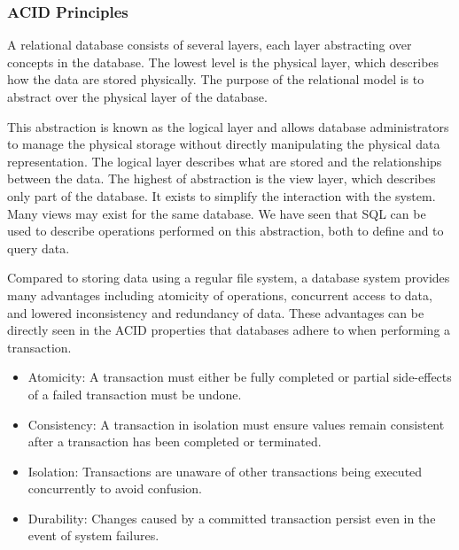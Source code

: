 \subsubsection*{ACID Principles}\label{sec:ACID}

A relational database consists of several layers, each layer abstracting over concepts in the database.
The lowest level is the physical layer, which describes how the data are stored physically.
The purpose of the relational model is to abstract over the physical layer of the database.

This abstraction is known as the logical layer and allows database administrators to manage the physical storage without directly manipulating the physical data representation.
The logical layer describes what are stored and the relationships between the data.
The highest of abstraction is the view layer, which describes only part of the database.
It exists to simplify the interaction with the system. Many views may exist for the same database.
\cite{DBSBook}
We have seen that SQL can be used to describe operations performed on this abstraction, both to define and to query data.

Compared to storing data using a regular file system, a database system provides many advantages including atomicity of operations, concurrent access to data, and lowered inconsistency and redundancy of data\cite{DBSBook}.
These advantages can be directly seen in the ACID properties that databases adhere to when performing a transaction\cite{DBSBook}.
\begin{itemize} \label{ACID}
    \item Atomicity: A transaction must either be fully completed or partial side-effects of a failed transaction must be undone.
    \item Consistency: A transaction in isolation must ensure values remain consistent after a transaction has been completed or terminated.
    \item Isolation: Transactions are unaware of other transactions being executed concurrently to avoid confusion.
    \item Durability: Changes caused by a committed transaction persist even in the event of system failures.
\end{itemize}

